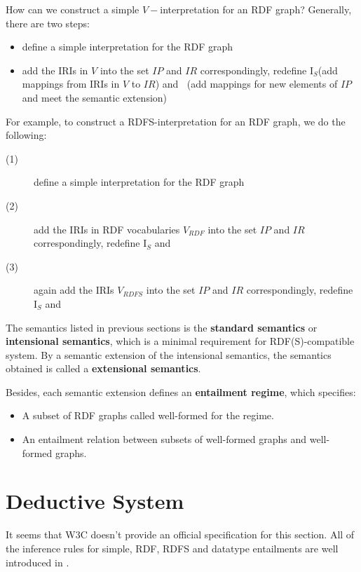 \documentclass{article}
\DeclareMathOperator{\IEXT}{I_{EXT}}
\begin{document}
\noindent How can we construct a simple $V-$interpretation for an RDF graph?
Generally, there are two steps:
\begin{itemize}
\item define a simple interpretation for the RDF graph
\item add the IRIs in $V$ into the set $IP$ and $IR$ correspondingly, redefine $\text{I}_S$(add mappings from IRIs in $V$ to $IR$) and $\IEXT$(add mappings for new elements of $IP$ and meet the semantic extension)
\end{itemize}
For example, to construct a RDFS-interpretation for an RDF graph, we do the following:
\begin{description}
\item[(1)]define a simple interpretation for the RDF graph
\item[(2)]add the IRIs in RDF vocabularies $V_{RDF}$ into the set $IP$ and $IR$ correspondingly, redefine $\text{I}_S$ and $\IEXT$
\item[(3)]again add the IRIs $V_{RDFS}$ into the set $IP$ and $IR$ correspondingly, redefine $\text{I}_S$ and $\IEXT$
\end{description}

\noindent The semantics listed in previous sections is the \textbf{standard semantics} or \textbf{intensional semantics}, which is a minimal requirement for RDF(S)-compatible system. By a semantic extension of the intensional semantics, the semantics obtained is called a \textbf{extensional semantics}. \newline

\noindent Besides, each semantic extension defines an \textbf{entailment regime}, which specifies:
\begin{itemize}
\item A subset of RDF graphs called well-formed for the regime.
\item An entailment relation between subsets of well-formed graphs and well-formed graphs.
\end{itemize}


\section{Deductive System}
It seems that W3C doesn't provide an official specification for this section. All of the inference rules for simple, RDF, RDFS and datatype entailments are well introduced in \cite{book}. 
\end{document}
